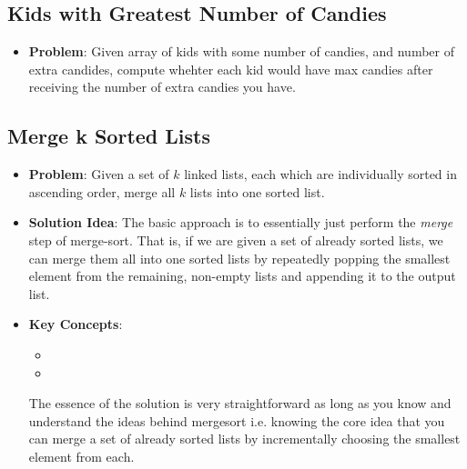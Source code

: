 \documentclass[10pt,a4paper]{article}
\begin{document}
\subsection*{Kids with Greatest Number of Candies}
\begin{itemize}
    \item \textbf{Problem}: Given array of kids with some number of candies, and number of extra candides, compute whehter each kid would have max candies after receiving the number of extra candies you have.
\end{itemize}

\subsection*{Merge k Sorted Lists}

\begin{itemize}
    \item \textbf{Problem}: Given a set of $k$ linked lists, each which are individually sorted in ascending order, merge all $k$ lists into one sorted list. 
    \item \textbf{Solution Idea}: The basic approach is to essentially just perform the \textit{merge} step of merge-sort. That is, if we are given a set of already sorted lists, we can merge them all into one sorted lists by repeatedly popping the smallest element from the remaining, non-empty lists and appending it to the output list.
    \item \textbf{Key Concepts}: 
    \begin{itemize}
        \item {}
        \item {}
    \end{itemize}
    The essence of the solution is very straightforward as long as you know and understand the ideas behind mergesort i.e. knowing the core idea that you can merge a set of already sorted lists by incrementally choosing the smallest element from each.
\end{itemize}
\end{document}
